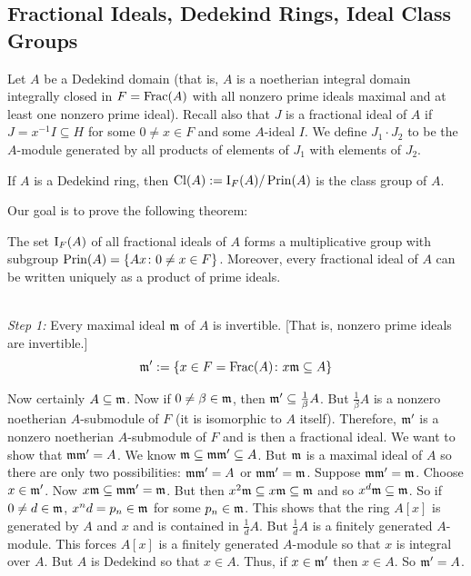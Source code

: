 \newpage
\subsection{Fractional Ideals, Dedekind Rings, Ideal Class Groups\label{sec:620_6}}

Let $A$ be a Dedekind domain (that is, $A$ is a noetherian integral domain integrally closed in $F=\operatorname{Frac}(A)$ with all nonzero prime ideals maximal and at least one nonzero prime ideal). Recall also that $J$ is a fractional ideal of $A$ if $J=x^{-1}I \subseteq H$ for some $0 \neq x \in F$ and some $A$-ideal $I$. We define $J_1 \cdot J_2$ to be the $A$-module generated by all products of elements of $J_1$ with elements of $J_2$. 

\begin{dfn}
If $A$ is a Dedekind ring, then $\operatorname{Cl}(A):=\operatorname{I}_F(A)/\operatorname{Prin}(A)$ is the class group of $A$.
\end{dfn}

Our goal is to prove the following theorem:

\begin{thm}
The set $\operatorname{I}_F(A)$ of all fractional ideals of $A$ forms a multiplicative group with subgroup $\operatorname{Prin}(A)=\{Ax \colon 0 \neq x \in F\}$. Moreover, every fractional ideal of $A$ can be written uniquely as a product of prime ideals.
\end{thm}

\pf \\

\noindent \emph{Step 1:} Every maximal ideal $\mathfrak{m}$ of $A$ is invertible. [That is, nonzero prime ideals are invertible.] 
	\[
	\mathfrak{m}' := \{ x \in F=\operatorname{Frac}(A) \colon x\mathfrak{m} \subseteq A\}
	\]
	
\noindent Now certainly $A \subseteq \mathfrak{m}$. Now if $0 \neq \beta \in \mathfrak{m}$, then $\mathfrak{m}' \subseteq \frac{1}{\beta} A$. But $\frac{1}{\beta}A$ is a nonzero noetherian $A$-submodule of $F$ (it is isomorphic to $A$ itself). Therefore, $\mathfrak{m}'$ is a nonzero noetherian $A$-submodule of $F$ and is then a fractional ideal. We want to show that $\mathfrak{m}\mathfrak{m}'=A$. We know $\mathfrak{m} \subseteq \mathfrak{m}\mathfrak{m}' \subseteq A$. But $\mathfrak{m}$ is a maximal ideal of $A$ so there are only two possibilities: $\mathfrak{m}\mathfrak{m}'=A$ or $\mathfrak{m}\mathfrak{m}'=\mathfrak{m}$. Suppose $\mathfrak{m}\mathfrak{m}'=\mathfrak{m}$. Choose $x \in \mathfrak{m}'$. Now $x\mathfrak{m} \subseteq \mathfrak{m}\mathfrak{m}'=\mathfrak{m}$. But then $x^2\mathfrak{m} \subseteq x\mathfrak{m} \subseteq \mathfrak{m}$ and so $x^d \mathfrak{m} \subseteq \mathfrak{m}$. So if $0 \neq d \in \mathfrak{m}$, $x^nd=p_n \in \mathfrak{m}$ for some $p_n \in \mathfrak{m}$. This shows that the ring $A[x]$ is generated by $A$ and $x$ and is contained in $\frac{1}{d}A$. But $\frac{1}{d}A$ is a finitely generated $A$-module. This forces $A[x]$ is a finitely generated $A$-module so that $x$ is integral over $A$. But $A$ is Dedekind so that $x \in A$. Thus, if $x\in \mathfrak{m}'$ then $x \in A$. So $\mathfrak{m}'=A$.


